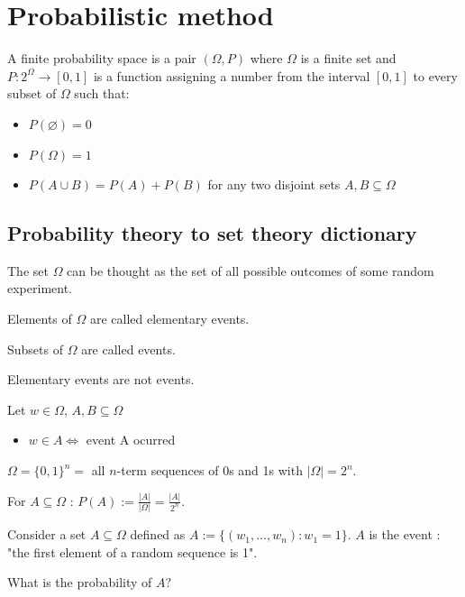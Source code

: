 \section{Probabilistic method}
\begin{definition}
A finite probability space is a pair $(\Omega,P)$ where $\Omega$ is a finite set and $P:2^{\Omega}\to[0,1]$ is a function assigning a number from the interval $[0,1]$ to every subset of $\Omega$ such that:
\begin{itemize}[1]
\item $P(\varnothing)=0$
\item $P(\Omega)=1$
\item $P(A\cup B)=P(A)+P(B)$ for any two disjoint sets $A,B\subseteq \Omega$
\end{itemize}
\end{definition}
\subsection{Probability theory to set theory dictionary}

The set $\Omega$ can be thought as the set of all possible outcomes of some random experiment.
\begin{definition}
Elements of $\Omega$ are called elementary events.
\end{definition}
\begin{definition}
Subsets of $\Omega$ are called events.
\end{definition}
\begin{remark}
Elementary events are not events.
\end{remark}
\begin{definition}
Let $w\in \Omega$, $A,B\subseteq \Omega$
\begin{itemize}
\item $w\in A\Leftrightarrow$ event A ocurred
\end{itemize}
\end{definition}
\begin{example}
$\Omega=\{ 0,1 \}^{n}=$ all $n$-term sequences of 0s and 1s with $|\Omega|=2^{n}$.

For $A\subseteq \Omega$ : $P(A):=\frac{|A|}{|\Omega|}=\frac{|A|}{2^{n}}$.

Consider a set $A\subseteq \Omega$ defined as $A:=\{ (w_{1},\dots,w_{n}):w_{1}=1 \}$. $A$ is the event : "the first element of a random sequence is 1".
\begin{problem}
What is the probability of $A$?
\end{problem}
\end{example}

